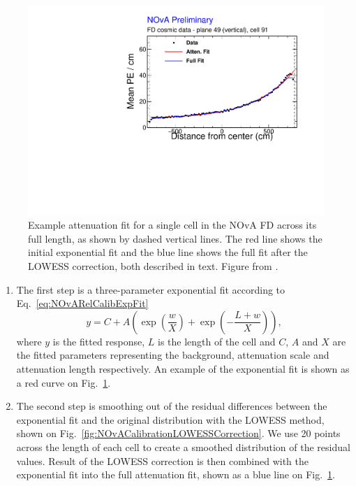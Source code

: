 \begin{figure}
    \centering
    \includegraphics[width=.7\textwidth]{Plots/NOvAExperiment/ExampleAttenuationFit.pdf}
    \caption[Example attenuation fit for NOvA Relative calibration]{Example attenuation fit for a single cell in the \acrshort{NOvA} \acrshort{FD} across its full length, as shown by dashed vertical lines. The red line shows the initial exponential fit and the blue line shows the full fit after the \acrshort{LOWESS} correction, both described in text. Figure from \cite{totfit_fd_datafitX_049_091.pdf}.}
    \label{fig:NOvACalibrationAttenuationFit}
\end{figure}

\begin{enumerate}
\item The first step is a three-parameter exponential fit according to Eq.~\ref{eq:NOvARelCalibExpFit}
\begin{equation}\label{eq:NOvARelCalibExpFit}
y=C+A\left(\exp\left(\frac{w}{X}\right)+\exp\left(-\frac{L+w}{X}\right)\right),
\end{equation}
where $y$ is the fitted response, $L$ is the length of the cell and $C$, $A$ and $X$ are the fitted parameters representing the background, attenuation scale and attenuation length respectively. An example of the exponential fit is shown as a red curve on Fig.~\ref{fig:NOvACalibrationAttenuationFit}.
\item The second step is smoothing out of the residual differences between the exponential fit and the original distribution with the \gls{LOWESS} method, shown on Fig.~\ref{fig:NOvACalibrationLOWESSCorrection}. We use 20 points across the length of each cell to create a smoothed distribution of the residual values. Result of the \gls{LOWESS} correction is then combined with the exponential fit into the full attenuation fit, shown as a blue line on Fig.~\ref{fig:NOvACalibrationAttenuationFit}.
\end{enumerate}

